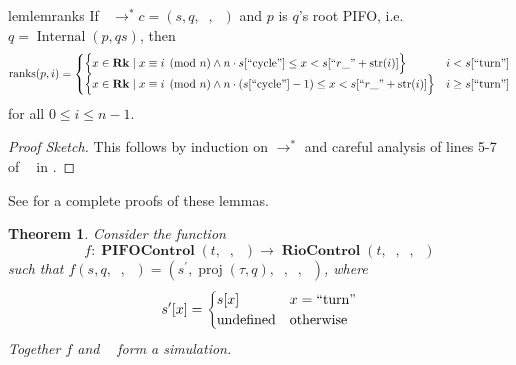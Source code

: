 \documentclass{amsart}
\DeclareMathOperator{\proj}{\mathrm{proj}}
\DeclareMathOperator{\Rk}{\mathbf{Rk}}
\DeclareMathOperator{\Internal}{\mathrm{Internal}}
\DeclareMathOperator{\PIFOControl}{\mathbf{PIFOControl}}
\DeclareMathOperator{\RioControl}{\mathbf{RioControl}}
\DeclareMathOperator{\zprepush}{z_{\mathrm{pre-push}}}
\DeclareMathOperator{\zpostpop}{z_{\mathrm{post-pop}}}
\DeclareMathOperator{\tzprepush}{z^{\prime}_{\mathrm{pre-push}}}
\DeclareMathOperator{\tzprepop}{z^{\prime}_{\mathrm{pre-pop}}}
\DeclareMathOperator{\tzpostpop}{z^{\prime}_{\mathrm{post-pop}}}
\DeclareMathOperator{\crr}{c_{\text{RR}}}
\DeclareMathOperator{\ranks}{\mathrm{ranks}}
\newtheorem{thm}{Theorem}[section]
\theoremstyle{definition}
\begin{document}
\begin{restatable}{lem}{lemranks}
    \label{lem:ranks}
    If $\crr \to^\ast c = (s, q, \zprepush, \zpostpop)$ and $p$ is $q$'s root PIFO, i.e. $q = \Internal(p, qs)$, then
    $$
        \ranks(p, i) =
        \begin{cases}
            \Big\{x \in \Rk \mid x \equiv i \pmod n \land n \cdot s[``\text{cycle}"] \leq x < s[``r\_" + \mathrm{str}(i)] \Big\} 
            & i < s[``\text{turn}"]\\
            \Big\{x \in \Rk \mid x \equiv i \pmod n \land n \cdot (s[``\text{cycle}"] - 1) \leq x < s[``r\_" + \mathrm{str}(i)]\Big\} 
            & i \geq s[``\text{turn}"]
        \end{cases}
    $$
    for all $0 \leq i \leq n - 1$.
\end{restatable}

\begin{proof}[Proof Sketch]
    This follows by induction on $\to^\ast$ and careful analysis of lines 5-7 of $\zpostpop$ in .
\end{proof}

See  for a complete proofs of these lemmas.

\begin{thm}
    Consider the function 
    $$f : \PIFOControl(t, \zprepush, \zpostpop) \to \RioControl(t, \tzprepush, \tzprepop, \tzpostpop)$$ 
    such that
    $f(s, q, \zprepush, \zpostpop) = (s^\prime, \proj(\tau, q), \tzprepush, \tzprepop, \tzpostpop)$, where
    $$
        s^\prime[x] = 
        \begin{cases}
            s[x] & x = ``\text{turn}"\\
            \text{undefined} & \text{otherwise}
        \end{cases}
    $$
    Together $f$ and $\crr$ form a simulation.
\end{thm}
\end{document}
